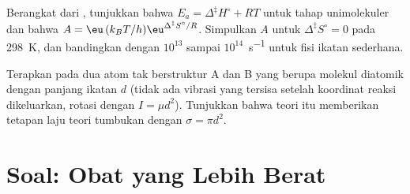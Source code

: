 \begin{exercise}[$\star\star\star$]\label{exo:b3:rate-theories:11}
Berangkat dari , tunjukkan bahwa $E_a = \Delta^{\ddagger}H^\circ + RT$
untuk tahap unimolekuler dan bahwa $A = \eu\,(k_BT/h)\eu^{\Delta^{\ddagger}S^\circ/R}$.
Simpulkan $A$ untuk $\Delta^{\ddagger}S^\circ = 0$ pada \qty{298}{K}, dan bandingkan
dengan $10^{13}$ sampai $10^{14}$~\unit{s^{-1}} untuk fisi ikatan sederhana.
\end{exercise}

\begin{exercise}[$\star\star\star$]\label{exo:b3:rate-theories:12}
Terapkan  pada dua atom tak berstruktur A dan B yang
 berupa molekul diatomik dengan panjang ikatan $d$
(tidak ada vibrasi yang tersisa setelah koordinat reaksi dikeluarkan, rotasi
dengan $I = \mu d^2$). Tunjukkan bahwa teori itu memberikan tetapan laju teori
tumbukan dengan $\sigma = \pi d^2$.
\end{exercise}

\section{Soal: Obat yang Lebih Berat}

